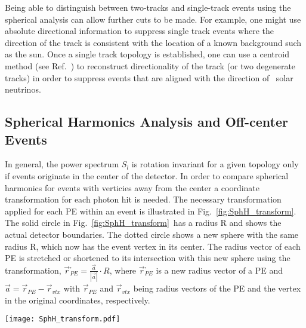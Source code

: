 Being able to distinguish between two-tracks and single-track events using the spherical analysis can allow further cuts to be made.  For example, one might use absolute directional information to suppress single track events where the direction of the track is consistent with the location of a known background such as the sun. Once a single track topology is established, one can use a centroid method (see Ref.~\cite{Directionality}) to reconstruct directionality of the track (or two degenerate tracks) in order to suppress events that are aligned with the direction of \B~solar neutrinos.


\subsection{Spherical Harmonics Analysis and Off-center Events}

In general, the power spectrum $S_l$ is rotation invariant for a given topology only if events originate in the center of the
detector. In order to compare spherical harmonics for events with verticies away from the center a coordinate transformation for each photon 
hit is needed. The necessary transformation applied for each PE within an event is illustrated in Fig.~\ref{fig:SphH_transform}. 
The solid circle in Fig.~\ref{fig:SphH_transform}~has a radius R and shows the actual detector boundaries. The dotted circle shows a new 
sphere with the same radius R, which now has the event vertex in its center. The radius vector of each PE is stretched or shortened to 
its intersection with this new sphere using the transformation, $\vec{r}^{,}_{PE} = \frac{\vec{a}}{|\vec{a}|} \cdot R$, 
where $\vec{r}^{,}_{PE}$ is a new radius vector of a PE and $\vec{a}=\vec{r}_{PE} - \vec{r}_{vtx}$ with $\vec{r}_{PE}$ and $\vec{r}_{vtx}$ 
being radius vectors of the PE and the vertex in the original coordinates, respectively.

\begin{figure*}[h]
  \centering
  \texttt{[image: SphH\_transform.pdf]}
  \caption{Coordinate transformation applied to events that are
    off-center. The solid circle schematically shows actual detector
    boundaries. The dotted circle shows a new sphere of radius R$=$6.5~m
    with the event vertex position in the center. The radius vector of
    each photon hit is stretched or shortened until the intersection with
    this new sphere using the transformation $\vec{r}^{,}_{hit} =
    \frac{\vec{a}}{|\vec{a}|} \cdot R$. Where $\vec{r}^{,}_{hit}$ is a
    new radius vector of the photon hit, $R$ is detector sphere radius,
    and $\vec{a}=\vec{r}_{hit} - \vec{r}_{vtx}$ with $\vec{r}_{hit}$
    and $\vec{r}_{vtx}$ being radius vectors of the photon hit and
    vertex position in original coordinates and correspondingly.}
  \label{fig:SphH_transform}
\end{figure*}


